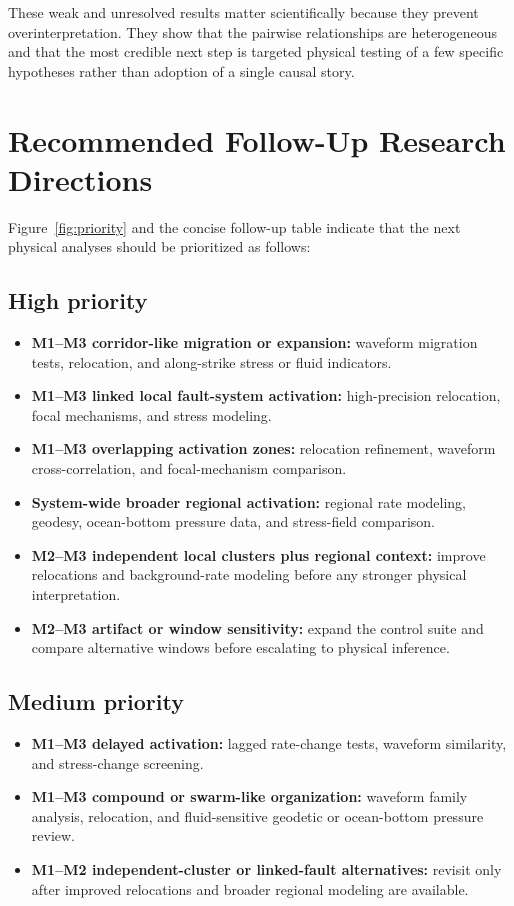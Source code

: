 \documentclass[11pt]{article}
\begin{document}
These weak and unresolved results matter scientifically because they prevent overinterpretation. They show that the pairwise relationships are heterogeneous and that the most credible next step is targeted physical testing of a few specific hypotheses rather than adoption of a single causal story.

\section{Recommended Follow-Up Research Directions}
Figure~\ref{fig:priority} and the concise follow-up table indicate that the next physical analyses should be prioritized as follows:

\subsection*{High priority}
\begin{itemize}
    \item \textbf{M1--M3 corridor-like migration or expansion:} waveform migration tests, relocation, and along-strike stress or fluid indicators.
    \item \textbf{M1--M3 linked local fault-system activation:} high-precision relocation, focal mechanisms, and stress modeling.
    \item \textbf{M1--M3 overlapping activation zones:} relocation refinement, waveform cross-correlation, and focal-mechanism comparison.
    \item \textbf{System-wide broader regional activation:} regional rate modeling, geodesy, ocean-bottom pressure data, and stress-field comparison.
    \item \textbf{M2--M3 independent local clusters plus regional context:} improve relocations and background-rate modeling before any stronger physical interpretation.
    \item \textbf{M2--M3 artifact or window sensitivity:} expand the control suite and compare alternative windows before escalating to physical inference.
\end{itemize}

\subsection*{Medium priority}
\begin{itemize}
    \item \textbf{M1--M3 delayed activation:} lagged rate-change tests, waveform similarity, and stress-change screening.
    \item \textbf{M1--M3 compound or swarm-like organization:} waveform family analysis, relocation, and fluid-sensitive geodetic or ocean-bottom pressure review.
    \item \textbf{M1--M2 independent-cluster or linked-fault alternatives:} revisit only after improved relocations and broader regional modeling are available.
\end{itemize}
\end{document}
